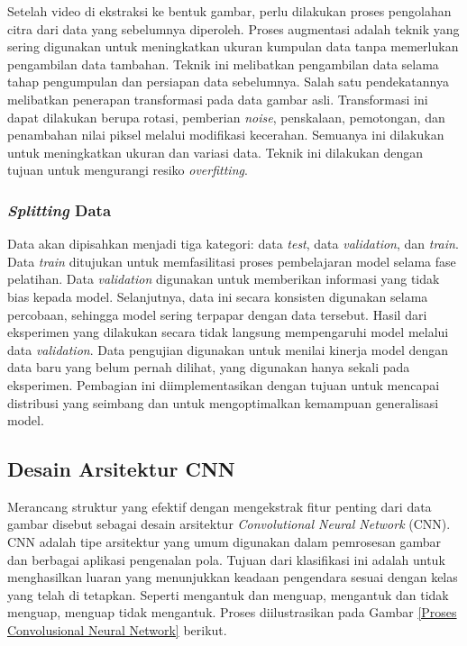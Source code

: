     Setelah video di ekstraksi ke bentuk gambar, perlu dilakukan proses pengolahan citra dari data yang sebelumnya diperoleh. Proses augmentasi adalah teknik yang sering digunakan untuk meningkatkan ukuran kumpulan data tanpa memerlukan pengambilan data tambahan. Teknik ini melibatkan pengambilan data selama tahap pengumpulan dan persiapan data sebelumnya. Salah satu pendekatannya melibatkan penerapan transformasi pada data gambar asli. Transformasi ini dapat dilakukan berupa rotasi, pemberian \textit{noise}, penskalaan, pemotongan, dan penambahan nilai piksel melalui modifikasi kecerahan. Semuanya ini dilakukan untuk meningkatkan ukuran dan variasi data. Teknik ini dilakukan dengan tujuan untuk mengurangi resiko \textit{overfitting}.

\subsubsection{\textit{Splitting} Data}
   Data akan dipisahkan menjadi tiga kategori: data \textit{test}, data \textit{validation}, dan \textit{train}. Data \textit{train} ditujukan untuk memfasilitasi proses pembelajaran model selama fase pelatihan. Data \textit{validation} digunakan untuk memberikan informasi yang tidak bias kepada model. Selanjutnya, data ini secara konsisten digunakan selama percobaan, sehingga model sering terpapar dengan data tersebut. Hasil dari eksperimen yang dilakukan secara tidak langsung mempengaruhi model melalui data \textit{validation}. 
   Data pengujian digunakan untuk menilai kinerja model dengan data baru yang belum pernah dilihat, yang digunakan hanya sekali pada eksperimen. Pembagian ini diimplementasikan dengan tujuan untuk mencapai distribusi yang seimbang dan untuk mengoptimalkan kemampuan generalisasi model.

\subsection{Desain Arsitektur CNN}

    Merancang struktur yang efektif dengan mengekstrak fitur penting dari data gambar disebut sebagai desain arsitektur \textit{Convolutional Neural Network} (CNN). CNN adalah tipe arsitektur yang umum digunakan dalam pemrosesan gambar dan berbagai aplikasi pengenalan pola. Tujuan dari klasifikasi ini adalah untuk menghasilkan luaran yang menunjukkan keadaan pengendara sesuai dengan kelas yang telah di tetapkan. Seperti mengantuk dan menguap, mengantuk dan tidak menguap, menguap tidak mengantuk.  Proses diilustrasikan pada Gambar \ref{Proses Convolusional Neural Network} berikut.
 
